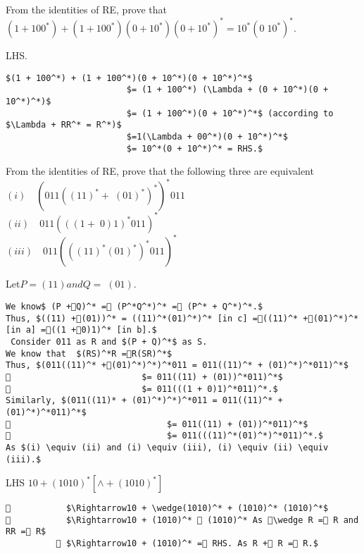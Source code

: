 \!\!\!\!\!\!\!\!\!\!\!\!\!\!\!\begin{example}
\textnormal{\small{From the identities of RE, prove that}}\\

$(1 + 100^*) + (1 + 100^*)(0 + 10^*)(0 + 10^*)^* = 10^*(0  10^*)^*.$
\end{example}
\!\!\!\!\!\!\!\!\!\!\!\!\!\!\!\begin{solution}\small{LHS}.
 \end{solution}
\begin{lstlisting}[mathescape=true]
                        $(1 + 100^*) + (1 + 100^*)(0 + 10^*)(0 + 10^*)^*$
                        $= (1 + 100^*) (\Lambda + (0 + 10^*)(0 + 10^*)^*)$
                        $= (1 + 100^*)(0 + 10^*)^*$ (according to $\Lambda + RR^* = R^*)$
                        $=1(\Lambda + 00^*)(0 + 10^*)^*$
                        $= 10^*(0 + 10^*)^* = RHS.$
\end{lstlisting}

\newpage
\begin{example}
\textnormal{\small{From the identities of RE, prove that the following three are equivalent}\\
$(i)\quad(011((11)^* + (01)^*)^*)^*011$\\
$(ii)\quad011(((1 + 0)1)^*011)^*$\\
$(iii)\quad011(((11)^*(01)^*)^*011)^*$}
\end{example}
\!\!\!\!\!\!\!\!\!\!\!\!\!\!\!\begin{solution}\small{Let$ P = (11) and Q =(01).$}
\begin{lstlisting}[mathescape=true]
We know$ (P +Q)^* = (P^*Q^*)^* = (P^* + Q^*)^*.$
Thus, $((11) +(01))^* = ((11)^*(01)^*)^* [in c] =((11)^* +(01)^*)^*[in a] =((1 +0)1)^* [in b].$
 Consider 011 as R and $(P + Q)^*$ as S.
We know that  $(RS)^*R =R(SR)^*$
Thus, $(011((11)^* +(01)^*)^*)^*011 = 011((11)^* + (01)^*)^*011)^*$
                          $= 011((11) + (01))^*011)^*$
                          $= 011(((1 + 0)1)^*011)^*.$
Similarly, $(011((11)* + (01)^*)^*)^*011 = 011((11)^* + (01)^*)^*011)^*$
                               $= 011((11) + (01))^*011)^*$
                               $= 011(((11)^*(01)^*)^*011)^*.$
As $(i) \equiv (ii) and (i) \equiv (iii), (i) \equiv (ii) \equiv (iii).$
\end{lstlisting}
\end{solution}
\!\!\!\!\!\!\!\!\!\!\!\!\!\!\!\begin{solution} \small{LHS $10 + (1010)^*[\wedge + (1010)^*]$}
\begin{lstlisting}[mathescape=true]
           $\Rightarrow10 + \wedge(1010)^* + (1010)^* (1010)^*$
           $\Rightarrow10 + (1010)^*  (1010)^* As \wedge R = R and RR = R$
           $\Rightarrow10 + (1010)^* = RHS. As R + R = R.$
\end{lstlisting}
\end{solution}
